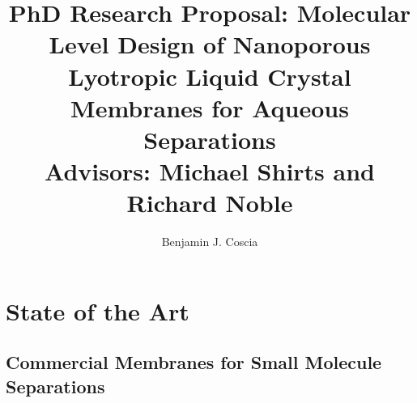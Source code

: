 \documentclass{article}
\title{PhD Research Proposal: Molecular Level Design of Nanoporous Lyotropic Liquid
Crystal Membranes for Aqueous Separations \\ \vspace{0.5cm}
\large Advisors: Michael Shirts and Richard Noble}
\author{Benjamin J. Coscia}
\begin{document}
  \graphicspath{{./figures/}}

  \maketitle
  \thispagestyle{empty}
  \clearpage
  \setcounter{page}{1} %

  \section{State of the Art}\label{section:state-of-the-art}

  \subsection*{Commercial Membranes for Small Molecule Separations}
  
  
  
  
\end{document}
